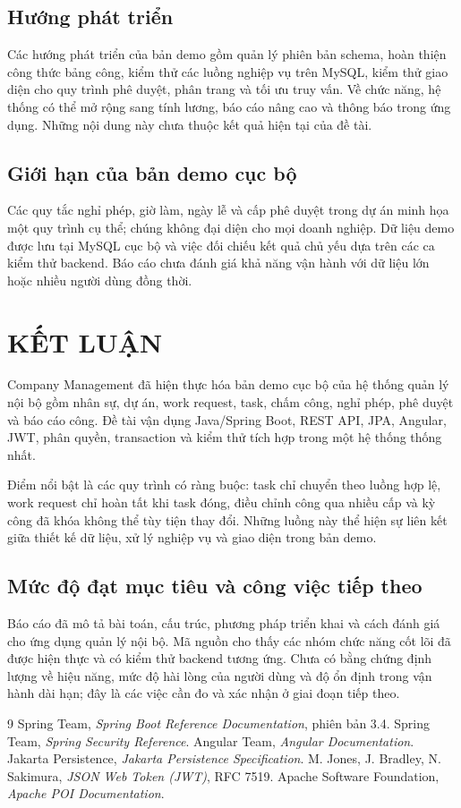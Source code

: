 \documentclass[12pt,a4paper,oneside]{report}
\newcommand{\projectname}{Company Management}
\begin{document}
\section{Hướng phát triển}
Các hướng phát triển của bản demo gồm quản lý phiên bản schema, hoàn thiện công thức bảng công, kiểm thử các luồng nghiệp vụ trên MySQL, kiểm thử giao diện cho quy trình phê duyệt, phân trang và tối ưu truy vấn. Về chức năng, hệ thống có thể mở rộng sang tính lương, báo cáo nâng cao và thông báo trong ứng dụng. Những nội dung này chưa thuộc kết quả hiện tại của đề tài.

\section{Giới hạn của bản demo cục bộ}
Các quy tắc nghỉ phép, giờ làm, ngày lễ và cấp phê duyệt trong dự án minh họa một quy trình cụ thể; chúng không đại diện cho mọi doanh nghiệp. Dữ liệu demo được lưu tại MySQL cục bộ và việc đối chiếu kết quả chủ yếu dựa trên các ca kiểm thử backend. Báo cáo chưa đánh giá khả năng vận hành với dữ liệu lớn hoặc nhiều người dùng đồng thời.

\chapter{KẾT LUẬN}
\projectname{} đã hiện thực hóa bản demo cục bộ của hệ thống quản lý nội bộ gồm nhân sự, dự án, work request, task, chấm công, nghỉ phép, phê duyệt và báo cáo công. Đề tài vận dụng Java/Spring Boot, REST API, JPA, Angular, JWT, phân quyền, transaction và kiểm thử tích hợp trong một hệ thống thống nhất.

Điểm nổi bật là các quy trình có ràng buộc: task chỉ chuyển theo luồng hợp lệ, work request chỉ hoàn tất khi task đóng, điều chỉnh công qua nhiều cấp và kỳ công đã khóa không thể tùy tiện thay đổi. Những luồng này thể hiện sự liên kết giữa thiết kế dữ liệu, xử lý nghiệp vụ và giao diện trong bản demo.

\section*{Mức độ đạt mục tiêu và công việc tiếp theo}
Báo cáo đã mô tả bài toán, cấu trúc, phương pháp triển khai và cách đánh giá cho ứng dụng quản lý nội bộ. Mã nguồn cho thấy các nhóm chức năng cốt lõi đã được hiện thực và có kiểm thử backend tương ứng. Chưa có bằng chứng định lượng về hiệu năng, mức độ hài lòng của người dùng và độ ổn định trong vận hành dài hạn; đây là các việc cần đo và xác nhận ở giai đoạn tiếp theo.

\begin{thebibliography}{9}
 Spring Team, \textit{Spring Boot Reference Documentation}, phiên bản 3.4.
 Spring Team, \textit{Spring Security Reference}.
 Angular Team, \textit{Angular Documentation}.
 Jakarta Persistence, \textit{Jakarta Persistence Specification}.
 M. Jones, J. Bradley, N. Sakimura, \textit{JSON Web Token (JWT)}, RFC 7519.
 Apache Software Foundation, \textit{Apache POI Documentation}.
\end{thebibliography}
\end{document}

